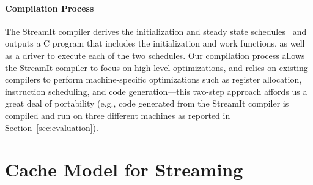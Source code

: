 \documentclass{sigplanconf}
\begin{document}
\paragraph*{Compilation Process}
The StreamIt compiler derives the initialization and steady state
schedules~\cite{karczma-lctes03} and outputs a C program that includes
the initialization and work functions, as well as a driver to execute
each of the two schedules. Our compilation process allows the StreamIt
compiler to focus on high level optimizations, and relies on existing
compilers to perform machine-specific optimizations such as register
allocation, instruction scheduling, and 
code generation---this two-step approach affords us a
great deal of portability (e.g., code generated from the StreamIt
compiler is compiled and run on three different machines as reported
in Section~\ref{sec:evaluation}).



\section{Cache Model for Streaming}
\label{sec:cache-model}
\end{document}
